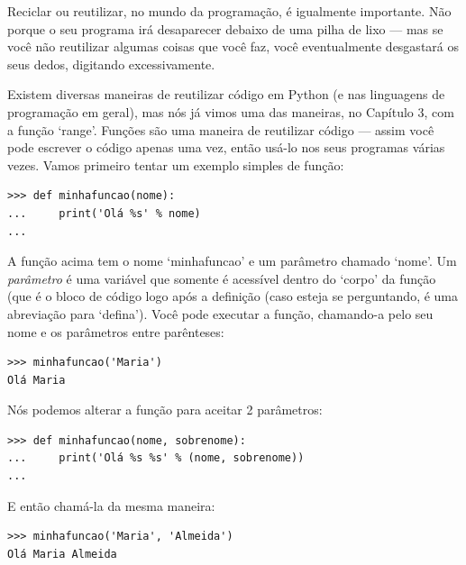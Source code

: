 Reciclar ou reutilizar, no mundo da programação, é igualmente importante. Não porque o seu programa irá desaparecer debaixo de uma pilha de lixo --- mas se você não reutilizar algumas coisas que você faz, você eventualmente desgastará os seus dedos, digitando excessivamente.

Existem diversas maneiras de reutilizar código em Python (e nas linguagens de programação em geral), mas nós já vimos uma das maneiras, no Capítulo 3, com a função `range'. Funções são uma maneira de reutilizar código --- assim você pode escrever o código apenas uma vez, então usá-lo nos seus programas várias vezes. Vamos primeiro tentar um exemplo simples de função:

\begin{listing}
\begin{verbatim}
>>> def minhafuncao(nome):
...     print('Olá %s' % nome)
...
\end{verbatim}
\end{listing}

A função acima tem o nome `minhafuncao' e um parâmetro chamado `nome'. Um \emph{parâmetro} é uma variável que somente é acessível dentro do `corpo' da função (que é o bloco de código logo após a definição  (caso esteja se perguntando,  é uma abreviação para `defina'). Você pode executar a função, chamando-a pelo seu nome e os parâmetros entre parênteses:

\begin{listing}
\begin{verbatim}
>>> minhafuncao('Maria')
Olá Maria
\end{verbatim}
\end{listing}

\noindent
Nós podemos alterar a função para aceitar 2 parâmetros:

\begin{listing}
\begin{verbatim}
>>> def minhafuncao(nome, sobrenome):
...     print('Olá %s %s' % (nome, sobrenome))
...
\end{verbatim}
\end{listing}

\noindent
E então chamá-la da mesma maneira:

\begin{listing}
\begin{verbatim}
>>> minhafuncao('Maria', 'Almeida')
Olá Maria Almeida
\end{verbatim}
\end{listing}

